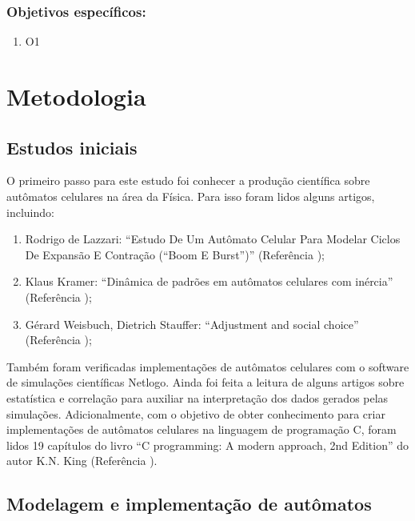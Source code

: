 \documentclass[
	12pt,				%
	openright,			%
	twoside,			%
	a4paper,			%
	english,			%
	french,				%
	spanish,			%
	brazil				%
	]{abntex2}
\begin{document}
\subsection*{Objetivos específicos:}
\begin{enumerate}
  \item O1
\end{enumerate}


\chapter{Metodologia}

\section{Estudos iniciais}

O primeiro passo para este estudo foi conhecer a produção científica sobre autômatos celulares na área da Física. Para isso foram lidos alguns artigos, incluindo:
\begin{enumerate}
    \item Rodrigo de Lazzari: “Estudo De Um Autômato Celular Para Modelar Ciclos De Expansão E Contração (“Boom E Burst”)” (Referência \cite{lazzari});
    \item Klaus Kramer: “Dinâmica de padrões em autômatos celulares com inércia” (Referência \cite{klaus});
    \item Gérard Weisbuch, Dietrich Stauffer: “Adjustment and social choice” (Referência \cite{stauffer});
\end{enumerate}
Também foram verificadas implementações de autômatos celulares  com o software de simulações científicas Netlogo. Ainda foi feita a leitura de alguns artigos sobre estatística e correlação para auxiliar na interpretação dos dados gerados pelas simulações. Adicionalmente, com o objetivo de obter conhecimento para criar implementações de autômatos celulares na linguagem de programação C, foram  lidos 19 capítulos do livro “C programming: A modern approach, 2nd Edition” do autor K.N. King (Referência \cite{king}).
    
\section{Modelagem e implementação de autômatos}
\end{document}
